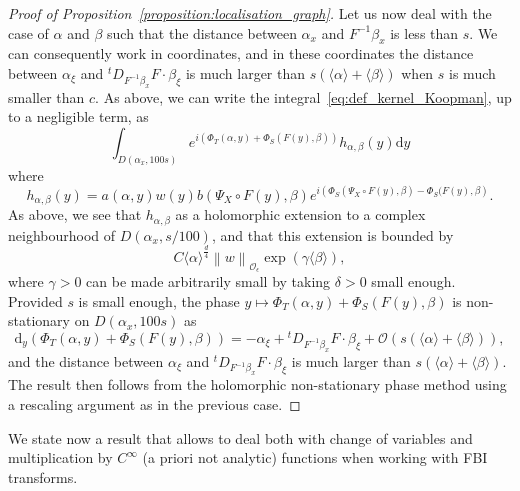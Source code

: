 \documentclass[10pt]{amsart}
\theoremstyle{definition}\newtheorem{defi}[theo]{Definition}\newtheorem{rema}[theo]{Remark}\newtheorem{exam}[theo]{Example}\newtheorem{exem}[theo]{Example}\newtheorem{nota}[theo]{Notation}
\newcommand{\p}[1]{\left(#1\right)}
\newcommand{\n}[1]{\left\|#1\right\|}
\newcommand{\brac}[1]{\langle #1 \rangle}
\newcommand{\clO}{\mathcal{O}}
\newcommand{\rmd}{\mathrm{d}}
\begin{document}
\begin{proof}[Proof of Proposition~\ref{proposition:localisation_graph}]
Let us now deal with the case of $\alpha$ and $\beta$ such that the distance between $\alpha_x$ and $F^{-1} \beta_x$ is less than $s$. We can consequently work in coordinates, and in these coordinates the distance between $\alpha_\xi$ and ${}^t D_{F^{-1} \beta_x} F \cdot \beta_\xi$ is much larger than $s\p{\brac{\alpha} + \brac{\beta}}$ when $s$ is much smaller than $c$. As above, we can write the integral~\eqref{eq:def_kernel_Koopman}, up to a negligible term, as
\begin{equation*}
\int_{D(\alpha_x,100s)} e^{i\left(\Phi_T(\alpha,y) + \Phi_S(F(y),\beta)\right)} h_{\alpha,\beta}(y) \rmd y
\end{equation*}
where
\begin{equation*}
h_{\alpha,\beta}(y) = a(\alpha,y) w(y) b(\Psi_X \circ F(y),\beta) e^{i \left(\Phi_S(\Psi_X \circ F(y),\beta) - \Phi_S(F(y),\beta\right)}.
\end{equation*}
As above, we see that $h_{\alpha,\beta}$ as a holomorphic extension to a complex neighbourhood of $D(\alpha_x,s/100)$, and that this extension is bounded by
\begin{equation*}
C \brac{\alpha}^{\frac{d}{4}} \n{w}_{\clO_\epsilon} \exp\p{\gamma \brac{\beta}},
\end{equation*}
where $\gamma > 0$ can be made arbitrarily small by taking $\delta > 0$ small enough. Provided $s$ is small enough, the phase $y \mapsto \Phi_T(\alpha,y) + \Phi_S(F(y),\beta)$ is non-stationary on $D(\alpha_x,100s)$ as
\begin{equation*}
\rmd _y\p{\Phi_T(\alpha,y) + \Phi_S(F(y),\beta)} = - \alpha_\xi + {}^t D_{F^{-1} \beta_x}F \cdot \beta_\xi + \clO\p{s\p{\brac{\alpha} + \brac{\beta}}},
\end{equation*}
and the distance between $\alpha_\xi$ and ${}^t D_{F^{-1} \beta_x} F \cdot \beta_\xi$ is much larger than $s\p{\brac{\alpha} + \brac{\beta}}$. The result then follows from the holomorphic non-stationary phase method using a rescaling argument as in the previous case.
\end{proof}

We state now a result that allows to deal both with change of variables and multiplication by $C^\infty$ (a priori not analytic) functions when working with FBI transforms.
\end{document}

